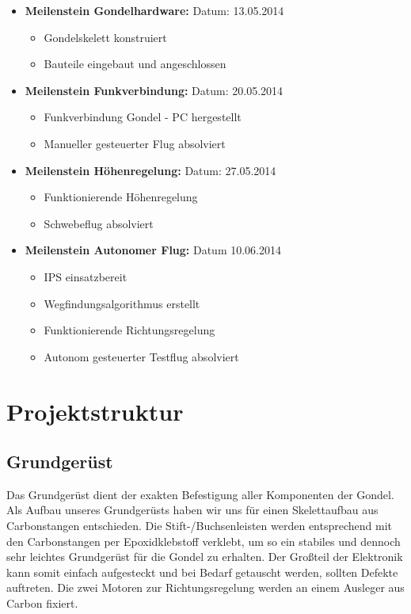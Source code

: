 \documentclass[lang=ngerman,inputenc=utf8,fontsize=10pt]{ldvarticle}
\begin{document}
\begin{itemize}
	\item \textbf{Meilenstein Gondelhardware:} Datum: 13.05.2014
		\begin{itemize}
			\item Gondelskelett konstruiert
			\item Bauteile eingebaut und angeschlossen
		\end{itemize}
	\item \textbf{Meilenstein Funkverbindung:} Datum: 20.05.2014
		\begin{itemize}
			\item Funkverbindung Gondel - PC hergestellt
			\item Manueller gesteuerter Flug absolviert
		\end{itemize}
	\item \textbf{Meilenstein Höhenregelung:} Datum: 27.05.2014
		\begin{itemize}
			\item Funktionierende Höhenregelung
			\item Schwebeflug absolviert
		\end{itemize}
	\item \textbf{Meilenstein Autonomer Flug:} Datum 10.06.2014
		\begin{itemize}
			\item IPS einsatzbereit
			\item Wegfindungsalgorithmus erstellt
			\item Funktionierende Richtungsregelung
			\item Autonom gesteuerter Testflug absolviert
		\end{itemize}
\end{itemize}

\section{Projektstruktur}

\subsection*{Grundgerüst}
Das Grundgerüst dient der exakten Befestigung aller Komponenten der Gondel.\\
Als Aufbau unseres Grundgerüsts haben wir uns für einen Skelettaufbau aus Carbonstangen entschieden. Die Stift-/Buchsenleisten werden entsprechend mit den Carbonstangen per Epoxidklebstoff verklebt, um so ein stabiles und dennoch sehr leichtes Grundgerüst für die Gondel zu erhalten. Der Großteil der Elektronik kann somit einfach aufgesteckt und bei Bedarf getauscht werden, sollten Defekte auftreten. Die zwei Motoren zur Richtungsregelung werden an einem Ausleger aus Carbon fixiert.
\end{document}
